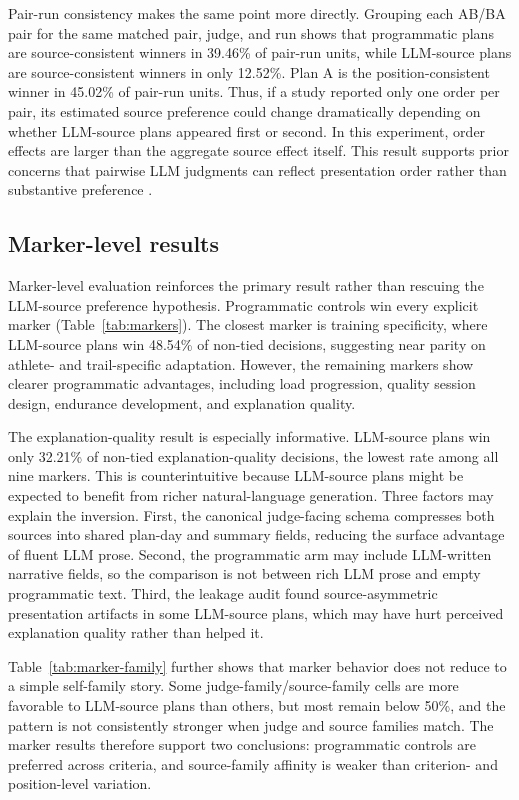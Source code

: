 \documentclass[11pt]{article}
\begin{document}
Pair-run consistency makes the same point more directly. Grouping each AB/BA pair for the same matched pair, judge, and run shows that programmatic plans are source-consistent winners in 39.46\% of pair-run units, while LLM-source plans are source-consistent winners in only 12.52\%. Plan A is the position-consistent winner in 45.02\% of pair-run units. Thus, if a study reported only one order per pair, its estimated source preference could change dramatically depending on whether LLM-source plans appeared first or second. In this experiment, order effects are larger than the aggregate source effect itself. This result supports prior concerns that pairwise LLM judgments can reflect presentation order rather than substantive preference \citep{zheng2023llmasajudge,schroeder2025trustllmjudgmentsreliability}.

\subsection{Marker-level results}

Marker-level evaluation reinforces the primary result rather than rescuing the LLM-source preference hypothesis. Programmatic controls win every explicit marker (Table~\ref{tab:markers}). The closest marker is training specificity, where LLM-source plans win 48.54\% of non-tied decisions, suggesting near parity on athlete- and trail-specific adaptation. However, the remaining markers show clearer programmatic advantages, including load progression, quality session design, endurance development, and explanation quality.

The explanation-quality result is especially informative. LLM-source plans win only 32.21\% of non-tied explanation-quality decisions, the lowest rate among all nine markers. This is counterintuitive because LLM-source plans might be expected to benefit from richer natural-language generation. Three factors may explain the inversion. First, the canonical judge-facing schema compresses both sources into shared plan-day and summary fields, reducing the surface advantage of fluent LLM prose. Second, the programmatic arm may include LLM-written narrative fields, so the comparison is not between rich LLM prose and empty programmatic text. Third, the leakage audit found source-asymmetric presentation artifacts in some LLM-source plans, which may have hurt perceived explanation quality rather than helped it.

Table~\ref{tab:marker-family} further shows that marker behavior does not reduce to a simple self-family story. Some judge-family/source-family cells are more favorable to LLM-source plans than others, but most remain below 50\%, and the pattern is not consistently stronger when judge and source families match. The marker results therefore support two conclusions: programmatic controls are preferred across criteria, and source-family affinity is weaker than criterion- and position-level variation.
\end{document}
